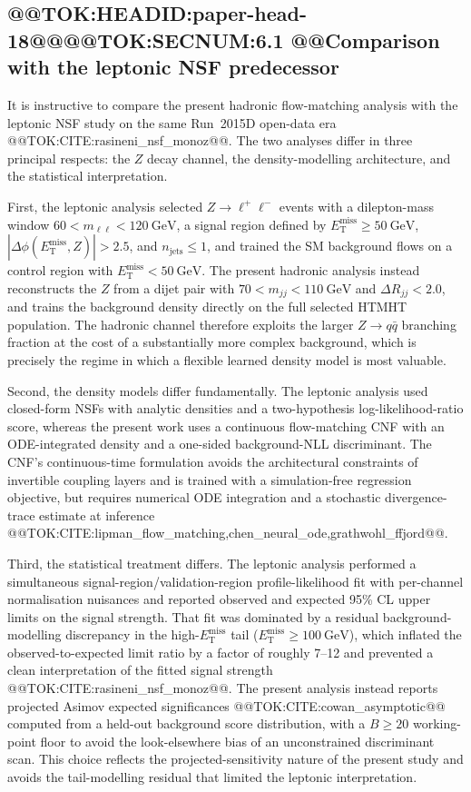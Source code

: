 \documentclass[11pt]{article}
\newcommand{\GeV}{\text{GeV}}
\newcommand{\MET}{\ensuremath{E_{\mathrm{T}}^{\mathrm{miss}}}}
\begin{document}
\subsection{@@TOK:HEADID:paper-head-18@@@@TOK:SECNUM:6.1 @@Comparison with the leptonic NSF predecessor}

It is instructive to compare the present hadronic flow-matching analysis
with the leptonic NSF study on the same Run~2015D open-data era
@@TOK:CITE:rasineni_nsf_monoz@@. The two analyses differ in three principal
respects: the $Z$ decay channel, the density-modelling architecture, and the
statistical interpretation.

First, the leptonic analysis selected $Z\to\ell^{+}\ell^{-}$ events with a
dilepton-mass window $60<m_{\ell\ell}<120~\GeV$, a signal region defined by
$\MET\geq50~\GeV$, $|\Delta\phi(\MET,Z)|>2.5$, and $n_{\mathrm{jets}}\leq1$,
and trained the SM background flows on a control region with
$\MET<50~\GeV$. The present hadronic analysis instead reconstructs the $Z$
from a dijet pair with $70<m_{jj}<110~\GeV$ and $\Delta R_{jj}<2.0$, and
trains the background density directly on the full selected HTMHT
population. The hadronic channel therefore exploits the larger $Z\to
q\bar{q}$ branching fraction at the cost of a substantially more complex
background, which is precisely the regime in which a flexible learned
density model is most valuable.

Second, the density models differ fundamentally. The leptonic analysis used
closed-form NSFs with analytic densities and a two-hypothesis
log-likelihood-ratio score, whereas the present work uses a continuous
flow-matching CNF with an ODE-integrated density and a one-sided
background-NLL discriminant. The CNF's continuous-time formulation avoids
the architectural constraints of invertible coupling layers and is trained
with a simulation-free regression objective, but requires numerical ODE
integration and a stochastic divergence-trace estimate at inference
@@TOK:CITE:lipman_flow_matching,chen_neural_ode,grathwohl_ffjord@@.

Third, the statistical treatment differs. The leptonic analysis performed a
simultaneous signal-region/validation-region profile-likelihood fit with
per-channel normalisation nuisances and reported observed and expected
95\% CL upper limits on the signal strength. That fit was dominated by a
residual background-modelling discrepancy in the high-\MET{} tail
($\MET\geq100~\GeV$), which inflated the observed-to-expected limit ratio
by a factor of roughly 7--12 and prevented a clean interpretation of the
fitted signal strength @@TOK:CITE:rasineni_nsf_monoz@@. The present analysis
instead reports projected Asimov expected significances
@@TOK:CITE:cowan_asymptotic@@ computed from a held-out background score
distribution, with a $B\geq20$ working-point floor to avoid the
look-elsewhere bias of an unconstrained discriminant scan. This choice
reflects the projected-sensitivity nature of the present study and avoids
the tail-modelling residual that limited the leptonic interpretation.
\end{document}
